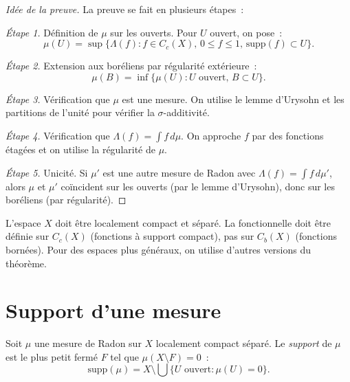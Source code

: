 \begin{proof}[Id\'ee de la preuve]
La preuve se fait en plusieurs \'etapes~:

\emph{\'Etape 1.} D\'efinition de $\mu$ sur les ouverts. Pour $U$ ouvert, on pose~:
\[
    \mu(U) = \sup\{\Lambda(f) : f \in C_c(X),\, 0 \leq f \leq 1,\,
    \mathrm{supp}(f) \subset U\}.
\]

\emph{\'Etape 2.} Extension aux bor\'eliens par r\'egularit\'e ext\'erieure~:
\[
    \mu(B) = \inf\{\mu(U) : U \text{ ouvert},\, B \subset U\}.
\]

\emph{\'Etape 3.} V\'erification que $\mu$ est une mesure. On utilise le lemme
d'Urysohn et les partitions de l'unit\'e pour v\'erifier la $\sigma$-additivit\'e.

\emph{\'Etape 4.} V\'erification que $\Lambda(f) = \int f\, d\mu$. On approche $f$
par des fonctions \'etag\'ees et on utilise la r\'egularit\'e de $\mu$.

\emph{\'Etape 5.} Unicit\'e. Si $\mu'$ est une autre mesure de Radon avec
$\Lambda(f) = \int f\, d\mu'$, alors $\mu$ et $\mu'$ co\"incident sur les ouverts
(par le lemme d'Urysohn), donc sur les bor\'eliens (par r\'egularit\'e).
\end{proof}

\begin{attention}[title=\textbf{Conditions du th\'eor\`eme}]
L'espace $X$ doit \^etre localement compact et s\'epar\'e. La fonctionnelle doit \^etre
d\'efinie sur $C_c(X)$ (fonctions \`a support compact), pas sur $C_b(X)$ (fonctions
born\'ees). Pour des espaces plus g\'en\'eraux, on utilise d'autres versions du th\'eor\`eme.
\end{attention}

\section{Support d'une mesure}

\begin{definition}
\label{def:support_mesure}
Soit $\mu$ une mesure de Radon sur $X$ localement compact s\'epar\'e. Le
\emph{support} de $\mu$ est le plus petit ferm\'e $F$ tel que $\mu(X \setminus F) = 0$~:
\[
    \mathrm{supp}(\mu) = X \setminus \bigcup\{U \text{ ouvert} : \mu(U) = 0\}.
\]
\end{definition}

